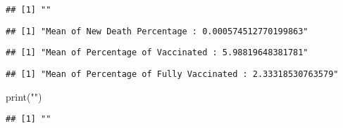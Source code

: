 \documentclass[
  12pt,
]{article}
\newenvironment{Shaded}{\begin{snugshade}}{\end{snugshade}}
\newcommand{\FunctionTok}[1]{\textcolor[rgb]{0.00,0.00,0.00}{#1}}
\newcommand{\NormalTok}[1]{#1}
\newcommand{\SpecialCharTok}[1]{\textcolor[rgb]{0.00,0.00,0.00}{#1}}
\newcommand{\StringTok}[1]{\textcolor[rgb]{0.31,0.60,0.02}{#1}}
\begin{document}
\begin{verbatim}
## [1] ""
\end{verbatim}

\begin{Shaded}
\end{Shaded}

\begin{verbatim}
## [1] "Mean of New Death Percentage : 0.000574512770199863"
\end{verbatim}

\begin{Shaded}
\end{Shaded}

\begin{verbatim}
## [1] "Mean of Percentage of Vaccinated : 5.98819648381781"
\end{verbatim}

\begin{Shaded}
\end{Shaded}

\begin{verbatim}
## [1] "Mean of Percentage of Fully Vaccinated : 2.33318530763579"
\end{verbatim}

\begin{Shaded}
\begin{Highlighting}[]
\FunctionTok{print}\NormalTok{(}\StringTok{""}\NormalTok{)}
\end{Highlighting}
\end{Shaded}

\begin{verbatim}
## [1] ""
\end{verbatim}
\end{document}
